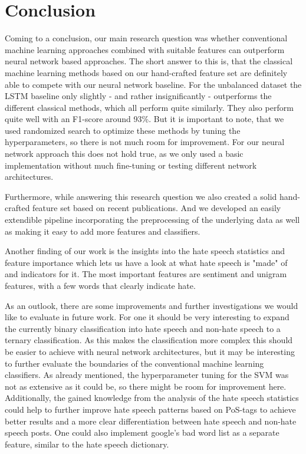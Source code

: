 \section{Conclusion} \label{conclusion}

Coming to a conclusion, our main research question was whether conventional machine learning approaches combined with suitable features can outperform neural network based approaches. The short answer to this is, that the classical machine learning methods based on our hand-crafted feature set are definitely able to compete with our neural network baseline. For the unbalanced dataset the LSTM baseline only slightly - and rather insignificantly - outperforms the different classical methods, which all perform quite similarly. They also perform quite well with an F1-score around 93\%. But it is important to note, that we used randomized search to optimize these methods by tuning the hyperparameters, so there is not much room for improvement. For our neural network approach this does not hold true, as we only used a basic implementation without much fine-tuning or testing different network architectures.

Furthermore, while answering this research question we also created a solid hand-crafted feature set based on recent publications. And we developed an easily extendible pipeline incorporating the preprocessing of the underlying data as well as making it easy to add more features and classifiers.

Another finding of our work is the insights into the hate speech statistics and feature importance which lets us have a look at what hate speech is "made" of and indicators for it. The most important features are sentiment and unigram features, with a few words that clearly indicate hate.

\vspace{0.5cm}

As an outlook, there are some improvements and further investigations we would like to evaluate in future work. For one it should be very interesting to expand the currently binary classification into hate speech and non-hate speech to a ternary classification. As this makes the classification more complex this should be easier to achieve with neural network architectures, but it may be interesting to further evaluate the boundaries of the conventional machine learning classifiers.
As already mentioned, the hyperparameter tuning for the SVM was not as extensive as it could be, so there might be room for improvement here.
Additionally, the gained knowledge from the analysis of the hate speech statistics could help to further improve hate speech patterns based on PoS-tags to achieve better results and a more clear differentiation between hate speech and non-hate speech posts.
One could also implement google's bad word list as a separate feature, similar to the hate speech dictionary.
